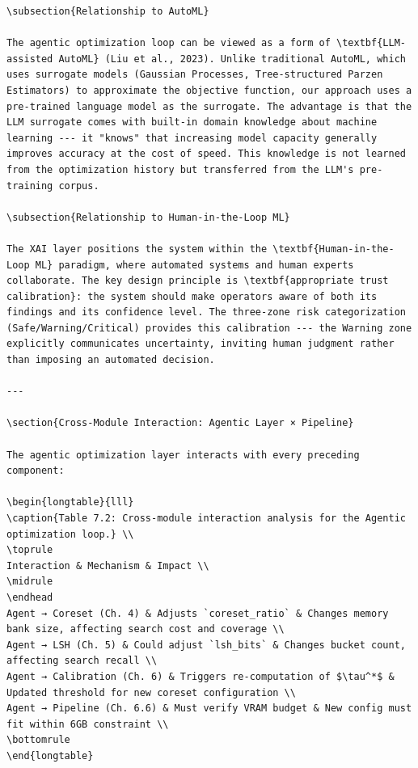 \documentclass[12pt,a4paper,oneside]{report}
\begin{document}
\begin{verbatim}
\subsection{Relationship to AutoML}

The agentic optimization loop can be viewed as a form of \textbf{LLM-assisted AutoML} (Liu et al., 2023). Unlike traditional AutoML, which uses surrogate models (Gaussian Processes, Tree-structured Parzen Estimators) to approximate the objective function, our approach uses a pre-trained language model as the surrogate. The advantage is that the LLM surrogate comes with built-in domain knowledge about machine learning --- it "knows" that increasing model capacity generally improves accuracy at the cost of speed. This knowledge is not learned from the optimization history but transferred from the LLM's pre-training corpus.

\subsection{Relationship to Human-in-the-Loop ML}

The XAI layer positions the system within the \textbf{Human-in-the-Loop ML} paradigm, where automated systems and human experts collaborate. The key design principle is \textbf{appropriate trust calibration}: the system should make operators aware of both its findings and its confidence level. The three-zone risk categorization (Safe/Warning/Critical) provides this calibration --- the Warning zone explicitly communicates uncertainty, inviting human judgment rather than imposing an automated decision.

---

\section{Cross-Module Interaction: Agentic Layer × Pipeline}

The agentic optimization layer interacts with every preceding component:

\begin{longtable}{lll}
\caption{Table 7.2: Cross-module interaction analysis for the Agentic optimization loop.} \\
\toprule
Interaction & Mechanism & Impact \\
\midrule
\endhead
Agent → Coreset (Ch. 4) & Adjusts `coreset_ratio` & Changes memory bank size, affecting search cost and coverage \\
Agent → LSH (Ch. 5) & Could adjust `lsh_bits` & Changes bucket count, affecting search recall \\
Agent → Calibration (Ch. 6) & Triggers re-computation of $\tau^*$ & Updated threshold for new coreset configuration \\
Agent → Pipeline (Ch. 6.6) & Must verify VRAM budget & New config must fit within 6GB constraint \\
\bottomrule
\end{longtable}




\end{verbatim}
\end{document}
